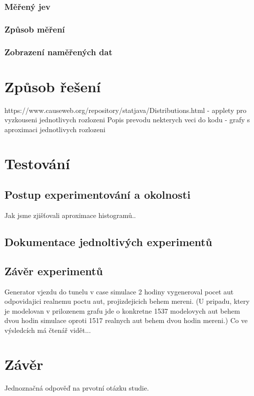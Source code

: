 \documentclass[11pt,a4paper]{article}
\begin{document}
		\subsubsection{Měřený jev}
		\subsubsection{Způsob měření}
		\subsubsection{Zobrazení naměřených dat}

\section{Způsob řešení}
https://www.causeweb.org/repository/statjava/Distributions.html - applety pro vyzkouseni jednotlivych rozlozeni
Popis prevodu nekterych veci do kodu - grafy s aproximaci jednotlivych rozlozeni

\section{Testování}
	\subsection{Postup experimentování a okolnosti}
	Jak jsme zjišťovali aproximace histogramů..
	\subsection{Dokumentace jednoltivých experimentů}
	\subsection{Závěr experimentů}
	Generator vjezdu do tunelu v case simulace 2 hodiny vygeneroval pocet aut odpovidajici realnemu poctu aut, projizdejicich behem mereni. (U pripadu, ktery je modelovan v prilozenem grafu jde o konkretne 1537 modelovych aut behem dvou hodin simulace oproti 1517 realnych aut behem dvou hodin mereni.)
	Co ve výsledcích má čtenář vidět...

\section{Závěr}
Jednoznačná odpověď na prvotní otázku studie.


\end{document}

